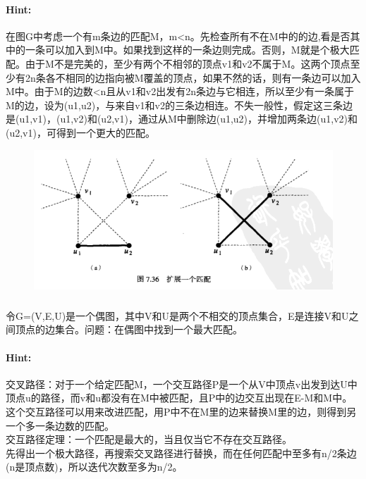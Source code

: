 \documentclass{article}
\begin{document}
     \paragraph{Hint:}在图G中考虑一个有m条边的匹配M，m<n。先检查所有不在M中的的边,看是否其中的一条可以加入到M中。如果找到这样的一条边则完成。否则，M就是个极大匹配。由于M不是完美的，至少有两个不相邻的顶点v1和v2不属于M。这两个顶点至少有2n条各不相同的边指向被M覆盖的顶点，如果不然的话，则有一条边可以加入M中。由于M的边数<n且从v1和v2出发有2n条边与它相连，所以至少有一条属于M的边，设为(u1,u2)，与来自v1和v2的三条边相连。不失一般性，假定这三条边是(u1,v1)，(u1,v2)和(u2,v1)，通过从M中删除边(u1,u2)，并增加两条边(u1,v2)和(u2,v1)，可得到一个更大的匹配。
   \begin{figure}[h]
 	\centering
 	\includegraphics[scale=0.6]{Max.png}
    \end{figure}
    
     
    \subsubsection{}令G=(V,E,U)是一个偶图，其中V和U是两个不相交的顶点集合，E是连接V和U之间顶点的边集合。问题：在偶图中找到一个最大匹配。
     \paragraph{Hint:}
     交叉路径：对于一个给定匹配M，一个交互路径P是一个从V中顶点v出发到达U中顶点u的路径，而v和u都没有在M中被匹配，且P中的边交互出现在E-M和M中。这个交互路径可以用来改进匹配，用P中不在M里的边来替换M里的边，则得到另一个多一条边数的匹配。\\
     交互路径定理：一个匹配是最大的，当且仅当它不存在交互路径。\\
     先得出一个极大路径，再搜索交叉路径进行替换，而在任何匹配中至多有n/2条边(n是顶点数)，所以迭代次数至多为n/2。\\
     
\end{document}
